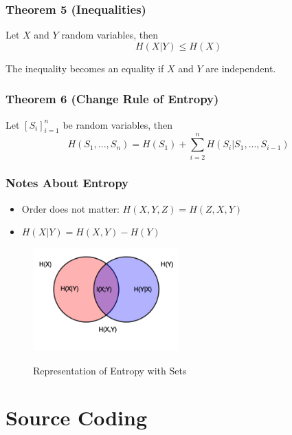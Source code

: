 \documentclass{article}
\begin{document}
\subsubsection{Theorem 5 (Inequalities)} Let $ X $ and $ Y $ random variables, then
\begin{equation}
H(X|Y) \leq H(X)
\end{equation}
\begin{tcolorbox}[width=12.1cm, leftrule=3mm]
The inequality becomes an equality if $ X $ and $ Y $ are independent.
\end{tcolorbox}

\subsubsection{Theorem 6 (Change Rule of Entropy)} Let $ [S_i]_{i=1}^{n}  $ be random variables, then
\begin{equation}
H(S_1,...,S_n) = H(S_1) + \sum_{i=2}^{n}H(S_i|S_1,...,S_{i-1})
\end{equation}

\subsubsection{Notes About Entropy} 
\begin{itemize}
\item Order does not matter: $ H(X,Y,Z) = H(Z,X,Y) $
\item $ H(X|Y) = H(X,Y) - H(Y) $
\end{itemize}

\begin{figure}[h]
  \hfill\includegraphics[width=0.5\textwidth]{entropy.png}\hspace*{\fill}
  \label{fig:entropy}
  
  \caption{Representation of Entropy with Sets}
\end{figure}

\section{Source Coding}
\end{document}
